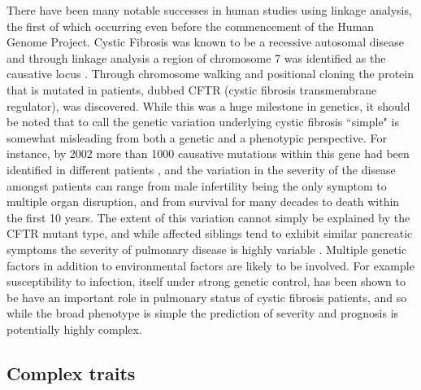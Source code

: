 There have been many notable successes in human studies using linkage analysis, the first of which occurring even before the commencement of the Human Genome Project. Cystic Fibrosis was known to be a recessive autosomal disease and through linkage analysis a region of chromosome 7 was identified as the causative locus \citep{Kerem1989}. Through chromosome walking \citep{Rommens1989} and positional cloning \citep{Riordan1989} the protein that is mutated in patients, dubbed CFTR (cystic fibrosis transmembrane regulator), was discovered. While this was a huge milestone in genetics, it should be noted that to call the genetic variation underlying cystic fibrosis ``simple" is somewhat misleading from both a genetic and a phenotypic perspective. For instance, by 2002 more than 1000 causative mutations within this gene had been identified in different patients \citep{Salvatore2002}, and the variation in the severity of the disease amongst patients can range from male infertility being the only symptom to multiple organ disruption, and from survival for many decades to death within the first 10 years. The extent of this variation cannot simply be explained by the CFTR mutant type, and while affected siblings tend to exhibit similar pancreatic symptoms \citep{Corey1989} the severity of pulmonary disease is highly variable \citep{Kerem1990}. Multiple genetic factors in addition to environmental factors are likely to be involved. For example susceptibility to infection, itself under strong genetic control, has been shown to be have an important role in pulmonary status of cystic fibrosis patients, and so while the broad phenotype is simple the prediction of severity and prognosis is potentially highly complex.

\subsection{Complex traits}

